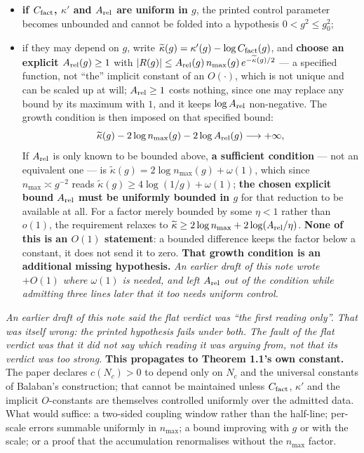\documentclass[11pt]{article}
\begin{document}
\begin{itemize}\setlength{\itemsep}{0pt}
\item \textbf{if $C_{\rm fact}$, $\kappa'$ and $A_{\rm rel}$ are uniform in $g$},
the printed control parameter becomes unbounded and cannot be folded into a hypothesis
$0<g^2\le g_0^2$;
\item if they may depend on $g$, write
$\widetilde\kappa(g)=\kappa'(g)-\log C_{\rm fact}(g)$, and \textbf{choose an explicit
$A_{\rm rel}(g)\ge1$} with
$|R(g)|\le A_{\rm rel}(g)\,n_{\max}(g)\,e^{-\widetilde\kappa(g)/2}$ --- a specified
function, not ``the'' implicit constant of an $O(\cdot)$, which is not unique and can be
scaled up at will; $A_{\rm rel}\ge1$ costs nothing, since one may replace any bound by
its maximum with $1$, and it keeps $\log A_{\rm rel}$ non-negative. The growth condition
is then imposed on that specified bound:
\[
\widetilde\kappa(g)-2\log n_{\max}(g)-2\log A_{\rm rel}(g)\longrightarrow+\infty ,
\]
If $A_{\rm rel}$ is only known to be bounded above, \textbf{a sufficient
condition} --- not an equivalent one --- is $\widetilde\kappa(g)=2\log
n_{\max}(g)+\omega(1)$, which since $n_{\max}\asymp g^{-2}$ reads
$\widetilde\kappa(g)\ge4\log(1/g)+\omega(1)$; \textbf{the chosen explicit bound
$A_{\rm rel}$ must be uniformly bounded in $g$} for that reduction to be available at
all. For a
factor merely bounded by some $\eta<1$ rather than $o(1)$, the requirement relaxes to
$\widetilde\kappa\ge2\log n_{\max}+2\log(A_{\rm rel}/\eta)$. \textbf{None of this is an
$O(1)$ statement}: a bounded difference keeps the factor below a constant, it does not
send it to zero. \textbf{That growth condition is an additional missing hypothesis.}
\emph{An earlier draft of this note wrote $+O(1)$ where $\omega(1)$ is needed, and left
$A_{\rm rel}$ out of the condition while admitting three lines later that it too needs
uniform control.}
\end{itemize}
\emph{An earlier draft of this note said the flat verdict was ``the first reading
only''. That was itself wrong: the printed hypothesis fails under \emph{both}. The fault
of the flat verdict was that it did not say which reading it was arguing from, not that
its verdict was too strong.} \textbf{This propagates to Theorem 1.1's own constant.} The paper declares
$c(N_c)>0$ to depend only on $N_c$ and the universal constants of Balaban's
construction; that cannot be maintained unless $C_{\rm fact}$, $\kappa'$ and the
implicit $O$-constants are themselves controlled uniformly over the admitted data.
What would suffice: a two-sided coupling window rather than the half-line;
per-scale errors summable uniformly in $n_{\max}$; a bound improving with $g$ or with
the scale; or a proof that the accumulation renormalises without the $n_{\max}$ factor.
\end{document}
